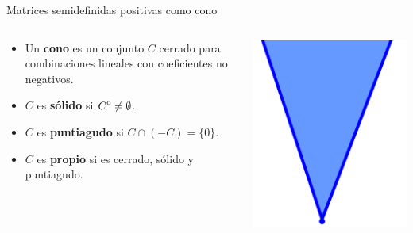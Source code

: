 \documentclass[10pt, compress]{beamer}
\begin{document}
\begin{frame}[shrink]{Matrices semidefinidas positivas como cono}
  \begin{columns}
  \begin{definition}[Cono]
    \begin{itemize}
      \item Un \textbf{cono} es un conjunto $C$ cerrado para combinaciones lineales con coeficientes no negativos.
      \item $C$ es \textbf{sólido} si ${\kern0ptC}^{\mathrm{o}} \ne \emptyset$.
      \item $C$ es \textbf{puntiagudo} si $C\cap(-C) = \{0\}$.
      \item $C$ es \textbf{propio} si es cerrado, sólido y puntiagudo.
    \end{itemize}

  \end{definition}
  \centering\includegraphics[width=\textwidth]{images/cone.png}

  \end{columns}


\end{frame}
\end{document}
